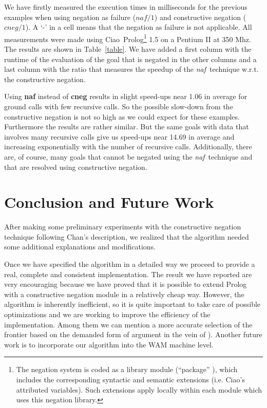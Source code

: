 \documentclass{llncs}
\newcommand{\naf}{{\em naf}}\newcommand{\viejo}[1]{}
\newcommand{\ciao}{Ciao}
\begin{document}
We have firstly measured the execution times in milliseconds for the
previous examples when using negation as failure ($naf/1$) and
constructive negation ($cneg/1$). A `-' in a cell means that the
negation as failure is not applicable. All measurements were made
using \ciao\ Prolog\footnote{The negation system is coded as a library
  module (``package'' \cite{ciao-modules-cl2000}), which includes the
  corresponding syntactic and semantic extensions (i.e. Ciao's
  attributed variables). Such extensions apply locally within each
  module which uses this negation library.} 1.5 on a Pentium II at 350
Mhz. The results are shown in Table~\ref{table}. We have added a first
column with the runtime of the evaluation of the goal that is negated
in the other columns and a last column with the ratio that measures the
speedup of the \naf\ technique w.r.t. the constructive negation.

Using {\bf naf} instead of {\bf cneg} results in slight speed-ups near
1.06 in average for ground calls with few recursive calls. So the
possible slow-down from the constructive negation is not so high as we
could expect for these examples. Furthermore the results are rather
similar. But the same goals with data that involves many recursive
calls give us speed-ups near 14.69 in average and increasing
exponentially with the number of recursive calls. Additionally, there
are, of course, many goals that cannot be negated using the \naf\
technique and that are resolved using constructive negation. 

 


\vspace{-1em}
\section{Conclusion and Future Work}
\label{conclusion}
\vspace{-1em}
After making some preliminary experiments with the constructive 
negation technique  following Chan's description, we realized that the
algorithm needed some additional explanations and modifications.

Once we have specified the algorithm in a detailed way we proceed to provide
a real, complete and consistent implementation. The result we have reported are
very encouraging because we have proved that it is possible to extend
Prolog with a constructive negation module in a relatively cheap way.
However, the algorithm is inherently inefficient, so it is quite 
important to take care of possible optimizations and we are working 
to improve the efficiency of the implementation. Among them we can mention
a more accurate selection of the frontier based on the demanded form
of argument in the vein of \cite{Moreno2}). Another future work is
to incorporate our algorithm into the WAM machine level.
\end{document}
